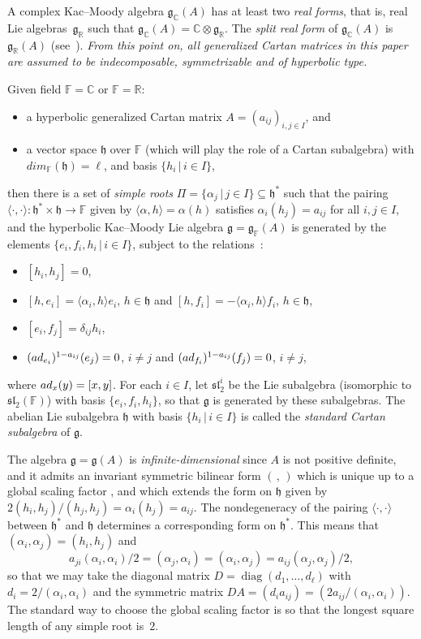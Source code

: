 \documentclass[11pt]{article}
\numberwithin{equation}{section}
\numberwithin{equation}{section}
\def\C{{\mathbb C}}
\def\F{{\mathbb F}}
\def\R{\mathbb{R}}
\def\g{\mathfrak{g}}
\def\fg{\mathfrak{g}}
\def\h{\mathfrak{h}}
\def\fsl{\mathfrak{sl}}
\begin{document}
A complex Kac--Moody algebra $\fg_\C(A)$ has at least two {\em real forms}, that is, real Lie algebras~$\fg_\R$ such that $\fg_\C(A) = \C\otimes \fg_\R$. The {\em split real form} of $\fg_\C(A)$ is $\fg_\R(A)$ (see~\cite{BBMR95}). {\it From this point on, all generalized Cartan matrices in this paper are assumed to be indecomposable, symmetrizable and of hyperbolic type.}

Given field $\F = \C$ or $\F = \R$:
\begin{itemize}\itemsep=0pt
 \item[--] a hyperbolic generalized Cartan matrix $A=(a_{ij})_{i,j\in I}$, and
 \item[--] a vector space $\h$ over $\F$ (which will play the role of a Cartan subalgebra) with $dim_\F(\h)=\ell$, and basis $\{h_i\, |\, i\in I\}$,
\end{itemize}
then there is a set of {\it simple roots} $\Pi=\{\alpha_j \, |\, j\in I\}\subseteq \h^*$ such that the pairing $\langle\cdot,\cdot\rangle\colon \h^*\times \h\to\F$ given by $\langle\alpha,h\rangle = \alpha(h)$ satisfies $\alpha_i(h_j) = a_{ij}$ for all $i,j\in I$, and
the hyperbolic Kac--Moody Lie algebra $\g=\g_\F(A)$ is generated by the elements $\{e_i, f_i, h_i\, |\, i\in I\}$, subject to the relations~\cite{GabberKac81, Kac90}:
\begin{itemize}\itemsep=0pt
 \item[--] $[h_i, h_j]=0$,
 \item[--] $[h,e_i]=\langle\alpha_i,h\rangle e_i$, $h\in \h$ and $[h,f_i]=-\langle\alpha_i,h\rangle f_i$, $h\in \h$,
 \item[--] $[e_i,f_j]=\delta_{ij}h_i$,
 \item[--] $({\rm ad}_{e_i})^{1-a_{ij}}(e_j)=0$, $i\neq j$ and $({\rm ad}_{f_i})^{1-a_{ij}}(f_j)=0$, $i\neq j$,
\end{itemize}

\noindent where ${\rm ad}_x(y)=[x,y]$. For each $i\in I$, let $\fsl_2^i$ be the Lie subalgebra (isomorphic to $\fsl_2(\F)$) with basis $\{e_i, f_i,h_i\}$, so that $\g$ is generated by these subalgebras. The abelian Lie subalgebra $\h$ with basis $\{h_i\, |\, i\in I\}$ is called the {\it standard Cartan subalgebra} of $\g$.

The algebra $\g=\g(A)$ is {\it infinite-dimensional} since $A$ is not positive definite, and it
admits an invariant symmetric bilinear form $(\hspace{2pt},\hspace{2pt})$ which is unique up to a global scaling factor
\cite[Section~II]{Kac90}, and which extends the form on $\h$ given by $2(h_i,h_j)/(h_j,h_j) = \alpha_i(h_j) = a_{ij}$. The nondegeneracy
of the pairing $\langle\cdot,\cdot\rangle$ between $\h^*$ and $\h$ determines a corresponding form on $\h^*$. This means that
$(\alpha_i,\alpha_j) = (h_i,h_j)$ and
\[a_{ji} (\alpha_i,\alpha_i)/2 = (\alpha_j,\alpha_i) = (\alpha_i,\alpha_j) = a_{ij} (\alpha_j,\alpha_j)/2, \]
so that we may take the diagonal matrix $D = \operatorname{diag}(d_1,\dots,d_\ell)$ with $d_i = 2/(\alpha_i,\alpha_i)$ and the symmetric matrix
$DA = (d_i a_{ij}) = (2 a_{ij}/(\alpha_i,\alpha_i))$. The standard way to choose
the global scaling factor is so that the longest square length of any simple root is~$2$.
\end{document}
